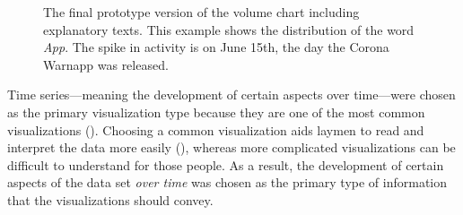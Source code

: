 \begin{figure}[htb!]
    \caption{The final prototype version of the volume chart including explanatory texts. This example shows the distribution of the word \emph{App}. The spike in activity is on June 15th, the day the Corona Warnapp was released.}
    \label{fig:volume_barchart}
\end{figure}

Time series---meaning the development of certain aspects over time---were chosen as the primary visualization type because they are one of the most common visualizations (\cite{heerTourVisualizationZoo2010}). Choosing a common visualization aids laymen to read and interpret the data more easily (\cite{bornerInvestigatingAspectsData2016}), whereas more complicated visualizations can be difficult to understand for those people. As a result, the development of certain aspects of the data set \emph{over time} was chosen as the primary type of information that the visualizations should convey.

